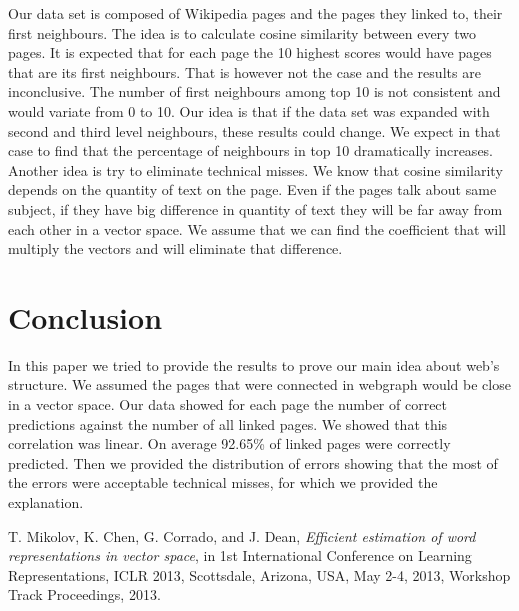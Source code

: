 \documentclass{article}
\begin{document}
Our data set is composed of Wikipedia pages and the pages they linked to, their first neighbours. The idea is to calculate cosine similarity between every two pages. It is expected that for each page the 10 highest scores would have pages that are its first neighbours. That is however not the case and the results are inconclusive. The number of first neighbours among top 10 is not consistent and would variate from 0 to 10. \newline
Our idea is that if the data set was expanded with second and third level neighbours, these results could change. We expect in that case to find that the percentage of neighbours in top 10 dramatically increases.\newline
Another idea is try to eliminate technical misses. We know that cosine similarity depends on the quantity of text on the page. Even if the pages talk about same subject, if they have big difference in quantity of text they will be far away from each other in a vector space. We assume that we can find the coefficient that will multiply the vectors and will eliminate that difference. 

\section{Conclusion}

In this paper we tried to provide the results to prove our main idea about web's structure. We assumed the pages that were connected in webgraph would be close in a vector space. Our data showed for each page the number of correct predictions against the number of all linked pages. We showed that this correlation was linear. On average 92.65\% of linked pages were correctly predicted. Then we provided the distribution of errors showing that the most of the errors were acceptable technical misses, for which we provided the explanation. 

\begin{thebibliography}{9}
	T. Mikolov, K. Chen, G. Corrado, and J. Dean,
		\textit{Efficient estimation of word representations in vector space},
		in 1st International Conference on Learning Representations,
		ICLR 2013, 
		Scottsdale, Arizona, USA, May 2-4, 2013, Workshop Track Proceedings,
		2013.
\end{thebibliography}
\end{document}
